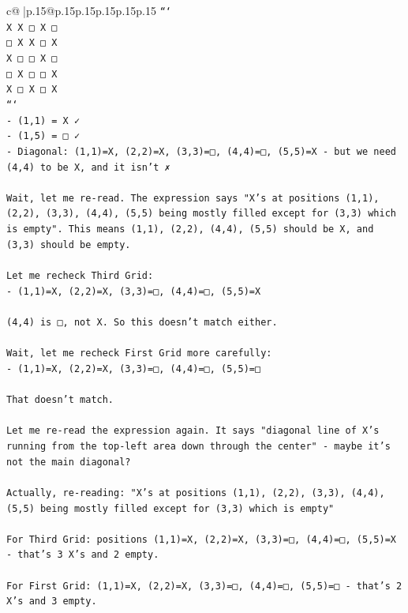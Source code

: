 \documentclass{article}
\begin{document}
{\begin{supertabular}{c@{$\;$}|p{.15\linewidth}@{}p{.15\linewidth}p{.15\linewidth}p{.15\linewidth}p{.15\linewidth}p{.15\linewidth}}
{{{\texttt{```} \\
\texttt{X X □ X □} \\
\texttt{□ X X □ X} \\
\texttt{X □ □ X □} \\
\texttt{□ X □ □ X} \\
\texttt{X □ X □ X} \\
\texttt{```} \\
\texttt{{-} (1,1) = X ✓} \\
\texttt{{-} (1,5) = □ ✓} \\
\texttt{{-} Diagonal: (1,1)=X, (2,2)=X, (3,3)=□, (4,4)=□, (5,5)=X {-} but we need (4,4) to be X, and it isn't ✗} \\
\\ 
\texttt{Wait, let me re{-}read. The expression says "X's at positions (1,1), (2,2), (3,3), (4,4), (5,5) being mostly filled except for (3,3) which is empty". This means (1,1), (2,2), (4,4), (5,5) should be X, and (3,3) should be empty.} \\
\\ 
\texttt{Let me recheck Third Grid:} \\
\texttt{{-} (1,1)=X, (2,2)=X, (3,3)=□, (4,4)=□, (5,5)=X} \\
\\ 
\texttt{(4,4) is □, not X. So this doesn't match either.} \\
\\ 
\texttt{Wait, let me recheck First Grid more carefully:} \\
\texttt{{-} (1,1)=X, (2,2)=X, (3,3)=□, (4,4)=□, (5,5)=□} \\
\\ 
\texttt{That doesn't match.} \\
\\ 
\texttt{Let me re{-}read the expression again. It says "diagonal line of X's running from the top{-}left area down through the center" {-} maybe it's not the main diagonal?} \\
\\ 
\texttt{Actually, re{-}reading: "X's at positions (1,1), (2,2), (3,3), (4,4), (5,5) being mostly filled except for (3,3) which is empty"} \\
\\ 
\texttt{For Third Grid: positions (1,1)=X, (2,2)=X, (3,3)=□, (4,4)=□, (5,5)=X {-} that's 3 X's and 2 empty.} \\
\\ 
\texttt{For First Grid: (1,1)=X, (2,2)=X, (3,3)=□, (4,4)=□, (5,5)=□ {-} that's 2 X's and 3 empty.} \\
}}}
\end{supertabular}}
\end{document}
